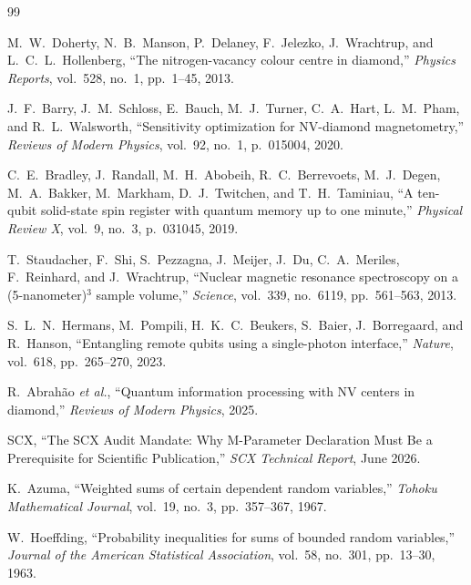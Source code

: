 \documentclass[11pt,a4paper]{article}
\theoremstyle{definition}
\begin{document}
\begin{thebibliography}{99}

M.~W.~Doherty, N.~B.~Manson, P.~Delaney, F.~Jelezko, J.~Wrachtrup, and
L.~C.~L.~Hollenberg, ``The nitrogen-vacancy colour centre in diamond,''
\emph{Physics Reports}, vol.~528, no.~1, pp.~1--45, 2013.

J.~F.~Barry, J.~M.~Schloss, E.~Bauch, M.~J.~Turner, C.~A.~Hart,
L.~M.~Pham, and R.~L.~Walsworth, ``Sensitivity optimization for
NV-diamond magnetometry,'' \emph{Reviews of Modern Physics}, vol.~92,
no.~1, p.~015004, 2020.

C.~E.~Bradley, J.~Randall, M.~H.~Abobeih, R.~C.~Berrevoets,
M.~J.~Degen, M.~A.~Bakker, M.~Markham, D.~J.~Twitchen, and
T.~H.~Taminiau, ``A ten-qubit solid-state spin register with quantum
memory up to one minute,'' \emph{Physical Review X}, vol.~9, no.~3,
p.~031045, 2019.

T.~Staudacher, F.~Shi, S.~Pezzagna, J.~Meijer, J.~Du, C.~A.~Meriles,
F.~Reinhard, and J.~Wrachtrup, ``Nuclear magnetic resonance spectroscopy
on a (5-nanometer)$^3$ sample volume,'' \emph{Science}, vol.~339,
no.~6119, pp.~561--563, 2013.

S.~L.~N.~Hermans, M.~Pompili, H.~K.~C.~Beukers, S.~Baier,
J.~Borregaard, and R.~Hanson, ``Entangling remote qubits using
a single-photon interface,'' \emph{Nature}, vol.~618, pp.~265--270,
2023.

R.~Abrahão \emph{et al.}, ``Quantum information processing with
NV centers in diamond,'' \emph{Reviews of Modern Physics}, 2025.

SCX, ``The SCX Audit Mandate: Why M-Parameter
Declaration Must Be a Prerequisite for Scientific Publication,''
\emph{SCX Technical Report}, June 2026.

K.~Azuma, ``Weighted sums of certain dependent random variables,''
\emph{Tohoku Mathematical Journal}, vol.~19, no.~3, pp.~357--367, 1967.

W.~Hoeffding, ``Probability inequalities for sums of bounded random
variables,'' \emph{Journal of the American Statistical Association},
vol.~58, no.~301, pp.~13--30, 1963.


\end{thebibliography}
\end{document}
